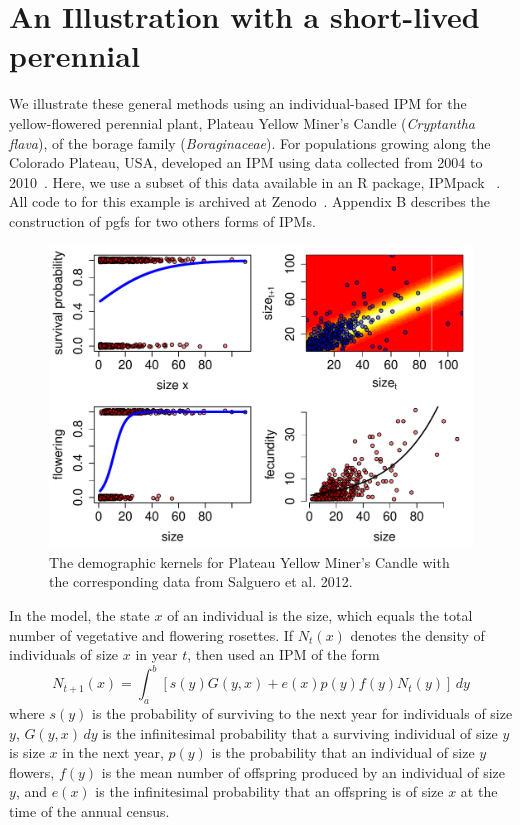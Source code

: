 \documentclass[12pt]{amsart}\usepackage[]{graphicx}\usepackage[]{color}
\makeatletter
\def\maxwidth{ %
  \ifdim\Gin@nat@width>\linewidth
    \linewidth
  \else
    \Gin@nat@width
  \fi
}
\newenvironment{knitrout}{}{} %
\makeatother
\begin{document}
\section*{An Illustration with a short-lived perennial}

We illustrate these general methods using an individual-based IPM for the yellow-flowered perennial plant, Plateau Yellow Miner's Candle (\emph{Cryptantha flava}), of the borage family (\emph{Boraginaceae}). For populations growing along the Colorado Plateau, USA, \citet{salguero-etal-12} developed an IPM using data collected from 2004 to 2010~\citep{salguero-gomez-etal-14}. Here, we use a subset of this data available in an R package, IPMpack ~\citep{IPMpack}.  All code to for this example is archived at Zenodo~\citep{schreiber-ross-ibipm-code-2015}. Appendix B describes the construction of pgfs for two others forms of IPMs. 

\begin{knitrout}
\color{fgcolor}\begin{figure}
\includegraphics[width=\maxwidth]{figure/components-1} \caption[The demographic kernels for Plateau Yellow Miner's Candle with the corresponding data from Salguero et al]{The demographic kernels for Plateau Yellow Miner's Candle with the corresponding data from Salguero et al. 2012.}\label{fig:components}
\end{figure}


\end{knitrout}

In the model, the state $x$ of an individual is the size, which equals the total number of vegetative and flowering rosettes. If $N_t(x)$ denotes the density of individuals of size $x$ in year $t$, then \citet{salguero-etal-12} used an IPM of the form
\[
N_{t+1}(x)=\int_a^b \left[ s(y)G(y, x)+e(x)p(y)f(y)N_t(y)\right]\, dy
\]
where $s(y)$ is the probability of surviving to the next year for individuals of size $y$, $G(y, x) \, dy$ is the infinitesimal probability that a surviving individual of size $y$ is size $x$ in the next year, $p(y)$ is the probability that an individual of size $y$ flowers, $f(y)$ is the mean number of offspring produced by an individual of size $y$, and $e(x)$ is the infinitesimal probability that an offspring is of size $x$ at the time of the annual census.
\end{document}
